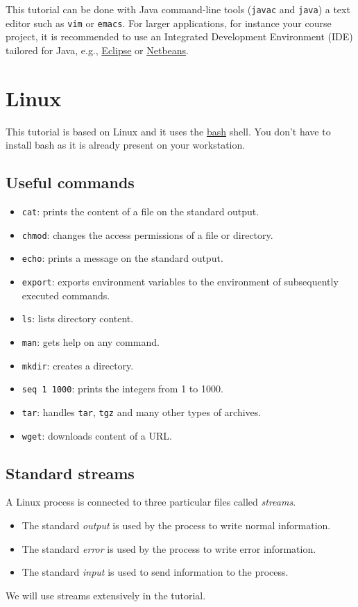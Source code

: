 \documentclass[11pt]{article}
\begin{document}
This tutorial can be done with Java command-line tools
(\texttt{javac} and \texttt{java}) a text editor such as \texttt{vim}
or \texttt{emacs}. For larger applications, for instance your course
project, it is recommended to use an Integrated Development
Environment (IDE) tailored for Java, e.g.,
\href{http://eclipse.org}{Eclipse} or
\href{http://netbeans.org}{Netbeans}.

\section{Linux}
This tutorial is based on Linux and it uses the
\href{https://www.gnu.org/software/bash/}{bash} shell. You don't have
to install bash as it is already present on your workstation.

\subsection{Useful commands}
\begin{itemize}
\item \texttt{cat}: prints the content of a file on the standard output.
\item \texttt{chmod}: changes the access permissions of a file or directory.
\item \texttt{echo}: prints a message on the standard output.
\item \texttt{export}: exports environment variables to the
  environment of subsequently executed commands.
\item \texttt{ls}: lists directory content.
\item \texttt{man}: gets help on any command.
\item \texttt{mkdir}: creates a directory.
\item \texttt{seq 1 1000}: prints the integers from 1 to 1000. 
\item \texttt{tar}: handles 
  \texttt{tar}, \texttt{tgz} and many other types of archives.
\item \texttt{wget}: downloads content of a URL.
\end{itemize}

\subsection{Standard streams}

A Linux process is connected to three particular files called \emph{streams}.
\begin{itemize}
\item The standard \emph{output} is used by the process to write normal information.
\item The standard \emph{error} is used by the process to write error information.
\item The standard \emph{input} is used to send information to the process.
\end{itemize}
We will use streams extensively in the tutorial.
\end{document}
